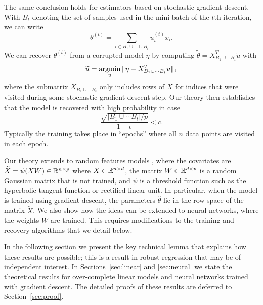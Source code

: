 The same conclusion holds for estimators based on stochastic gradient descent. With $B_t$ denoting the set of samples used in the mini-batch of the $t$th iteration, we can write
\begin{equation}
  \theta^{(t)} = \sum_{i\in B_1\cup\cdots\cup B_t} u_i^{(t)} x_i.
\end{equation}
We can recover $\theta^{(t)}$ from a corrupted model $\eta$ by computing $\tilde \theta = X^T_{B_1\cup \cdots B_t} \tilde u$ with
\begin{equation}
  \tilde u = \argmin_u \| \eta - X^T_{B_1\cup \cdots B_t} u\|_1
\end{equation}
where the submatrix $X_{B_1\cup\cdots B_t}$ only includes rows of $X$ for indices that were visited during some stochastic
gradient descent step. Our theory then establishes that the model is recovered with high probability in case
\begin{equation}
  \frac{\sqrt{{|B_1 \cup \cdots B_t|}/{p}}}{1-\epsilon} < c.
\end{equation}
Typically the training takes place in ``epochs'' where all $n$ data points are visited in each epoch.

 Our theory extends to random features models \citep{rahimi2008}, where the covariates are $\widetilde X = \psi(X W)\in \mathbb{R}^{n\times p}$ where $X\in\mathbb{R}^{n\times d}$, the matrix $W\in\mathbb{R}^{d\times p}$ is a random Gaussian matrix that is not trained, and $\psi$ is a threshold function such as the hyperbolic tangent function or rectified linear unit. In particular, when the model is trained using gradient descent, the parameters $\hat\theta$ lie in the row
space of the matrix $\tilde X$. We also show how the ideas can be extended to neural networks, where the weights $W$ are trained. This requires modifications to the training and recovery algorithms that we detail below.

In the following section we present the key technical lemma that explains how these results are possible; this is a result in robust regression that may be of independent interest. In Sections~\ref{sec:linear} and \ref{sec:neural} we state the theoretical results for over-complete linear models and neural networks trained with gradient descent. The detailed proofs of these results are deferred to Section~\ref{sec:proof}.

